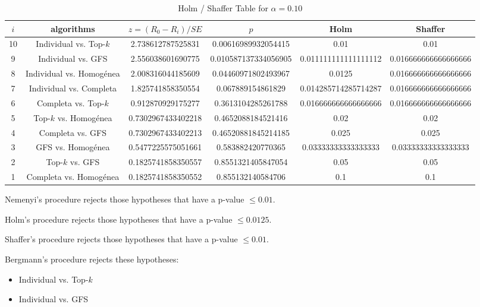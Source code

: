 \documentclass[a4paper,10pt]{article}
\begin{document}
\begin{landscape}
\begin{table}[!htp]
\centering\tiny
\caption{Holm / Shaffer Table for $\alpha=0.10$}
\begin{tabular}{cccccc}
$i$&algorithms&$z=(R_0 - R_i)/SE$&$p$&Holm&Shaffer\\
\hline
10&Individual vs. Top-$k$&2.738612787525831&0.00616989932054415&0.01&0.01\\
9&Individual vs. GFS&2.556038601690775&0.010587137334056905&0.011111111111111112&0.016666666666666666\\
8&Individual vs. Homogénea&2.008316044185609&0.04460971802493967&0.0125&0.016666666666666666\\
7&Individual vs. Completa&1.825741858350554&0.067889154861829&0.014285714285714287&0.016666666666666666\\
6&Completa vs. Top-$k$&0.912870929175277&0.3613104285261788&0.016666666666666666&0.016666666666666666\\
5&Top-$k$ vs. Homogénea&0.7302967433402218&0.4652088184521416&0.02&0.02\\
4&Completa vs. GFS&0.7302967433402213&0.46520881845214185&0.025&0.025\\
3&GFS vs. Homogénea&0.5477225575051661&0.583882420770365&0.03333333333333333&0.03333333333333333\\
2&Top-$k$ vs. GFS&0.1825741858350557&0.8551321405847054&0.05&0.05\\
1&Completa vs. Homogénea&0.1825741858350552&0.855132140584706&0.1&0.1\\
\hline
\end{tabular}
\end{table}
Nemenyi's procedure rejects those hypotheses that have a p-value $\le0.01$.


Holm's procedure rejects those hypotheses that have a p-value $\le0.0125$.


Shaffer's procedure rejects those hypotheses that have a p-value $\le0.01$.


Bergmann's procedure rejects these hypotheses:


\begin{itemize}


\item Individual vs. Top-$k$
\item Individual vs. GFS
\end{itemize}



\end{landscape}
\end{document}
